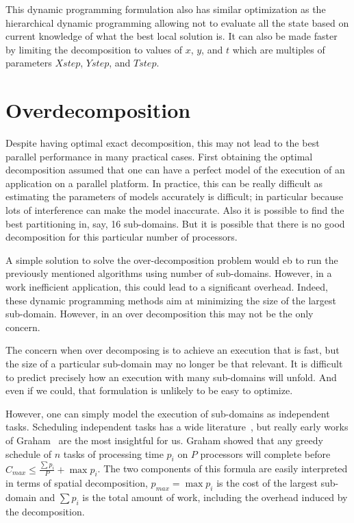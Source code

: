 \documentclass[10pt, conference, compsocconf]{IEEEtran}
\begin{document}
This dynamic programming formulation also has similar optimization as
the hierarchical dynamic programming allowing not to evaluate all the
state based on current knowledge of what the best local solution
is. It can also be made faster by limiting the decomposition to values
of $x$, $y$, and $t$ which are multiples of parameters $Xstep$,
$Ystep$, and $Tstep$.

\section{Overdecomposition}
\label{sec:overdecomposition}

Despite having optimal exact decomposition, this may not lead to the
best parallel performance in many practical cases. First obtaining the
optimal decomposition assumed that one can have a perfect model of the
execution of an application on a parallel platform. In practice, this
can be really difficult as estimating the parameters of models
accurately is difficult; in particular because lots of interference
can make the model inaccurate.
Also it is possible to find the best partitioning in, say, 16
sub-domains. But it is possible that there is no good decomposition for
this particular number of processors.

A simple solution to solve the over-decomposition problem would eb to
run the previously mentioned algorithms using number of
sub-domains. However, in a work inefficient application, this could
lead to a significant overhead. Indeed, these dynamic programming
methods aim at minimizing the size of the largest sub-domain. However,
in an over decomposition this may not be the only concern.

The concern when over decomposing is to achieve an execution that is
fast, but the size of a particular sub-domain may no longer be that
relevant. It is difficult to predict precisely how an execution with
many sub-domains will unfold. And even if we could, that formulation is
unlikely to be easy to optimize.

However, one can simply model the execution of sub-domains as
independent tasks. Scheduling independent tasks has a wide
literature~\cite{handbook}, but really early works of Graham~\cite{Graham66} are the
most insightful for us. Graham showed that any greedy schedule of $n$
tasks of processing time $p_i$ on $P$ processors will complete before
$C_{max} \leq \frac{\sum p_i}{P} + \max p_i$. The two components of
this formula are easily interpreted in terms of spatial decomposition,
$p_{max} = \max p_i$ is the cost of the largest sub-domain and $\sum p_i$ is the
total amount of work, including the overhead induced by the
decomposition.
\end{document}
